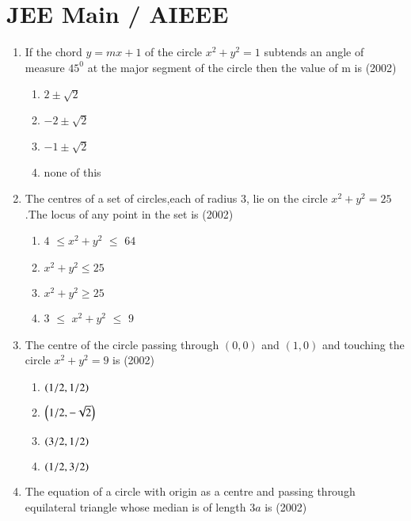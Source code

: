 \documentclass[journal,12pt,twocolumn]{IEEEtran}
\theoremstyle{remark}
\begin{document}
\section{JEE Main / AIEEE}
\begin{enumerate} 
\item If the chord $y=mx+1$ of the circle $x^2+y^2=1$ subtends an angle of measure $45^0$ at the major segment of the circle then the value of m is \hfill{(2002)}\\
\begin{enumerate}
\item$2\pm\sqrt{2}$\\
\item$-2\pm\sqrt{2}$\\
\item$-1\pm\sqrt{2}$\\
\item none of this\\
\end{enumerate}
\item The centres of a set of circles,each of radius $3$, lie on the circle $x^2+y^2=25$.The locus of any point in the set is \hfill{(2002)}\\
\begin{enumerate}
\item$4$ $\leq$$x^2+y^2$ $\leq$ $64$\\
\item$x^2+y^2\leq25$\\
\item$x^2+y^2\geq25$\\
\item$3$ $\leq$ $x^2+y^2$ $\leq$ $9$\\
\end{enumerate}
\item The centre of the circle passing through $(0,0)$ and $(1,0)$ and touching the circle $x^2+y^2=9$ is \hfill{(2002)}\\
\begin{enumerate}
\item$\left(1/2,1/2\right)$\\
\item$\left(1/2,-\sqrt{2}\right)$\\
\item$\left(3/2,1/2\right)$\\
\item$\left(1/2,3/2\right)$\\
\end{enumerate}
\item The equation of a circle with origin as a centre and passing through equilateral triangle whose median is of length $3a$ is \hfill{(2002)}\\

\end{enumerate}
\end{document}
